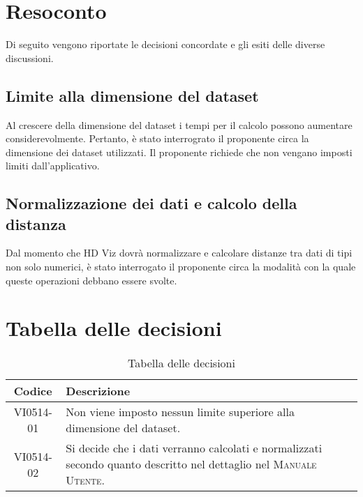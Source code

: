 \documentclass{article}
\begin{document}
\newpage
\section{Resoconto}
\label{sec:resoconto}

Di seguito vengono riportate le decisioni concordate e gli esiti delle diverse discussioni.

\subsection{Limite alla dimensione del dataset}
\label{itm:1}

Al crescere della dimensione del dataset i tempi per il calcolo possono aumentare considerevolmente. Pertanto, è stato interrograto il proponente circa la dimensione dei dataset utilizzati. Il proponente richiede che non vengano imposti limiti dall'applicativo.

\subsection{Normalizzazione dei dati e calcolo della distanza}
\label{itm:2}
Dal momento che HD Viz dovrà normalizzare e calcolare distanze tra dati di tipi non solo numerici, è stato interrogato il proponente circa la modalità con la quale queste operazioni debbano essere svolte. 


\section{Tabella delle decisioni}%
\label{sub:decisioni}

\begin{table}[!ht]
	\centering
	\begin{tabular}{|c|p{13cm}|}
		\hline
		\rowcolor{lightgray}
		\textbf{Codice} & \textbf{Descrizione} \\ 
		\hline
			VI0514-01 & Non viene imposto nessun limite superiore alla dimensione del dataset. \\
            VI0514-02 & Si decide che i dati verranno calcolati e normalizzati secondo quanto descritto nel dettaglio nel \textsc{Manuale Utente}. \\
		\hline
	\end{tabular}
	\caption{Tabella delle decisioni}
\end{table}
\end{document}
